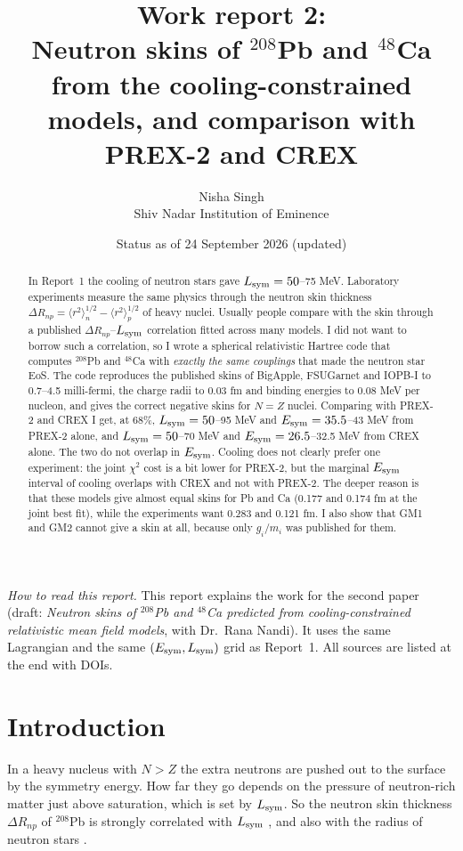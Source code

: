 \documentclass[11pt,a4paper]{article}
\title{Work report 2:\\ Neutron skins of $^{208}$Pb and $^{48}$Ca from the cooling-constrained models, and comparison with PREX-2 and CREX}
\author{Nisha Singh\\ Shiv Nadar Institution of Eminence}
\date{Status as of 24 September 2026 (updated)}
\newcommand{\Esym}{E_{\rm sym}}
\newcommand{\Lsym}{L_{\rm sym}}
\newcommand{\DRnp}{\Delta R_{np}}
\begin{document}
\sloppy
\maketitle

\noindent\textit{How to read this report.} This report explains the work for the second paper (draft: \emph{Neutron skins of $^{208}$Pb and $^{48}$Ca predicted from cooling-constrained relativistic mean field models}, with Dr.~Rana Nandi). It uses the same Lagrangian and the same $(\Esym,\Lsym)$ grid as Report~1. All sources are listed at the end with DOIs.

\begin{abstract}
In Report~1 the cooling of neutron stars gave $\Lsym=50$--75 MeV. Laboratory experiments measure the same physics through the neutron skin thickness $\DRnp=\langle r^2\rangle_n^{1/2}-\langle r^2\rangle_p^{1/2}$ of heavy nuclei. Usually people compare with the skin through a published $\DRnp$--$\Lsym$ correlation fitted across many models. I did not want to borrow such a correlation, so I wrote a spherical relativistic Hartree code that computes $^{208}$Pb and $^{48}$Ca with \emph{exactly the same couplings} that made the neutron star EoS. The code reproduces the published skins of BigApple, FSUGarnet and IOPB-I to 0.7--4.5 milli-fermi, the charge radii to 0.03 fm and binding energies to 0.08 MeV per nucleon, and gives the correct negative skins for $N=Z$ nuclei. Comparing with PREX-2 and CREX I get, at 68\%, $\Lsym=50$--95 MeV and $\Esym=35.5$--43 MeV from PREX-2 alone, and $\Lsym=50$--70 MeV and $\Esym=26.5$--32.5 MeV from CREX alone. The two do not overlap in $\Esym$. Cooling does not clearly prefer one experiment: the joint $\chi^2$ cost is a bit lower for PREX-2, but the marginal $\Esym$ interval of cooling overlaps with CREX and not with PREX-2. The deeper reason is that these models give almost equal skins for Pb and Ca (0.177 and 0.174 fm at the joint best fit), while the experiments want 0.283 and 0.121 fm. I also show that GM1 and GM2 cannot give a skin at all, because only $g_i/m_i$ was published for them.
\end{abstract}

\tableofcontents
\newpage

\section{Introduction}
In a heavy nucleus with $N>Z$ the extra neutrons are pushed out to the surface by the symmetry energy. How far they go depends on the pressure of neutron-rich matter just above saturation, which is set by $\Lsym$. So the neutron skin thickness $\DRnp$ of $^{208}$Pb is strongly correlated with $\Lsym$ \cite{Brown2000,TypelBrown2001,Furnstahl2002,RocaMaza2011}, and also with the radius of neutron stars \cite{HorowitzPiekarewicz2001b}.
\end{document}

